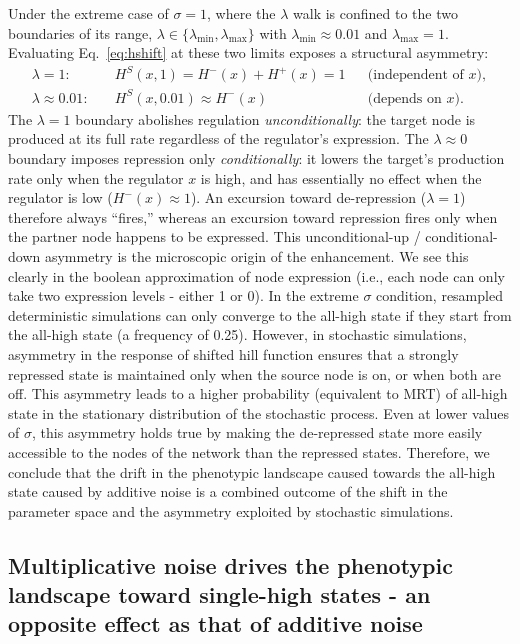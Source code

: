 \documentclass[11pt]{article}
\begin{document}
Under the extreme case of $\sigma=1$, where the $\lambda$ walk is confined to the two boundaries of its range, $\lambda\in\{\lambda_{\min},\lambda_{\max}\}$ with $\lambda_{\min}\approx 0.01$ and $\lambda_{\max}=1$. Evaluating Eq.~\eqref{eq:hshift} at these two limits exposes a structural asymmetry:
\begin{align}
  \lambda = 1: \quad & H^{S}(x,1) = H^{-}(x)+H^{+}(x) = 1
    && \text{(independent of } x\text{)},\\
  \lambda \approx 0.01: \quad & H^{S}(x,0.01) \approx H^{-}(x)
    && \text{(depends on } x\text{)}.
\end{align}
The $\lambda=1$ boundary abolishes regulation \emph{unconditionally}: the target node is produced at its full rate regardless of the regulator's expression. The $\lambda\approx 0$ boundary imposes repression only \emph{conditionally}: it lowers the target's production rate only when the regulator $x$ is high, and has essentially no effect when the regulator is low ($H^{-}(x)\!\approx\!1$). An excursion toward de-repression ($\lambda=1$) therefore always ``fires,'' whereas an excursion toward repression fires only when the partner node happens to be expressed. This unconditional-up / conditional-down asymmetry is the microscopic origin of the enhancement. We see this clearly in the boolean approximation of node expression (i.e., each node can only take two expression levels - either 1 or 0). In the extreme $\sigma$ condition, resampled deterministic simulations can only converge to the all-high state if they start from the all-high state (a frequency of 0.25). However, in stochastic simulations, asymmetry in the response of shifted hill function ensures that a strongly repressed state is maintained only when the source node is on, or when both are off. This asymmetry leads to a higher probability (equivalent to MRT) of all-high state in the stationary distribution of the stochastic process. Even at lower values of $\sigma$, this asymmetry holds true by making the de-repressed state more easily accessible to the nodes of the network than the repressed states. Therefore, we conclude that the drift in the phenotypic landscape caused towards the all-high state caused by additive noise is a combined outcome of the shift in the parameter space and the asymmetry exploited by stochastic simulations. 


\subsection{Multiplicative noise drives the phenotypic landscape toward single-high states - an opposite effect as that of additive noise}
\end{document}
